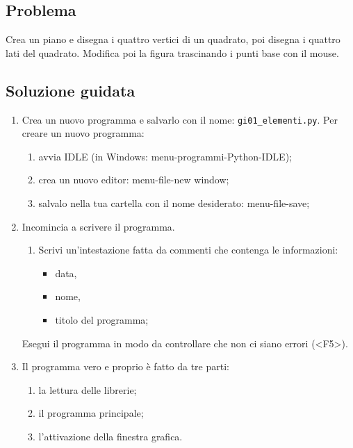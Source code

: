 \subsection{Problema}

Crea un piano e disegna i quattro vertici di un quadrato, poi
disegna i quattro lati del quadrato.
Modifica poi la figura trascinando i punti base con il mouse.

\subsection{Soluzione guidata}

\begin{enumerate} [noitemsep]
\item Crea un nuovo programma e salvarlo con il nome: 
\texttt{gi01\_elementi.py}.
Per creare un nuovo programma:

\begin{enumerate} [noitemsep]
\item avvia IDLE (in Windows: menu-programmi-Python-IDLE);
\item crea un nuovo editor: menu-file-new window;
\item salvalo nella tua cartella con il nome desiderato: menu-file-save;
\end{enumerate}

\item Incomincia a scrivere il programma.
\begin{enumerate} [noitemsep]
\item Scrivi un'intestazione fatta da commenti che contenga le informazioni:

\begin{itemize} [noitemsep]
\item data,
\item nome,
\item titolo del programma;
\end{itemize}
\end{enumerate}

Esegui il programma in modo da controllare che non ci siano errori 
(\textless{}F5\textgreater{}).
\item Il programma vero e proprio è fatto da tre parti:

\begin{enumerate} [noitemsep]
\item la lettura delle librerie;
\item il programma principale;
\item l'attivazione della finestra grafica.
\end{enumerate}


\end{enumerate}
